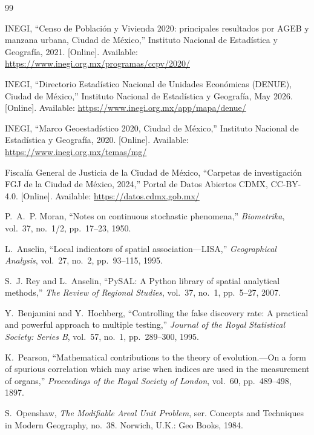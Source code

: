 \documentclass[peerreviewca]{IEEEtran}
\begin{document}
\begin{thebibliography}{99}

INEGI, ``Censo de Poblaci\'on y Vivienda 2020: principales resultados por AGEB y manzana urbana, Ciudad de M\'exico,'' Instituto Nacional de Estad\'istica y Geograf\'ia, 2021. [Online]. Available: \url{https://www.inegi.org.mx/programas/ccpv/2020/}

INEGI, ``Directorio Estad\'istico Nacional de Unidades Econ\'omicas (DENUE), Ciudad de M\'exico,'' Instituto Nacional de Estad\'istica y Geograf\'ia, May 2026. [Online]. Available: \url{https://www.inegi.org.mx/app/mapa/denue/}

INEGI, ``Marco Geoestad\'istico 2020, Ciudad de M\'exico,'' Instituto Nacional de Estad\'istica y Geograf\'ia, 2020. [Online]. Available: \url{https://www.inegi.org.mx/temas/mg/}

Fiscal\'ia General de Justicia de la Ciudad de M\'exico, ``Carpetas de investigaci\'on FGJ de la Ciudad de M\'exico, 2024,'' Portal de Datos Abiertos CDMX, CC-BY-4.0. [Online]. Available: \url{https://datos.cdmx.gob.mx/}

P.~A.~P. Moran, ``Notes on continuous stochastic phenomena,'' \emph{Biometrika}, vol.~37, no.~1/2, pp.~17--23, 1950.

L.~Anselin, ``Local indicators of spatial association---LISA,'' \emph{Geographical Analysis}, vol.~27, no.~2, pp.~93--115, 1995.

S.~J. Rey and L.~Anselin, ``PySAL: A Python library of spatial analytical methods,'' \emph{The Review of Regional Studies}, vol.~37, no.~1, pp.~5--27, 2007.

Y.~Benjamini and Y.~Hochberg, ``Controlling the false discovery rate: A practical and powerful approach to multiple testing,'' \emph{Journal of the Royal Statistical Society: Series B}, vol.~57, no.~1, pp.~289--300, 1995.

K.~Pearson, ``Mathematical contributions to the theory of evolution.---On a form of spurious correlation which may arise when indices are used in the measurement of organs,'' \emph{Proceedings of the Royal Society of London}, vol.~60, pp.~489--498, 1897.

S.~Openshaw, \emph{The Modifiable Areal Unit Problem}, ser. Concepts and Techniques in Modern Geography, no.~38. Norwich, U.K.: Geo Books, 1984.

\end{thebibliography}
\end{document}
